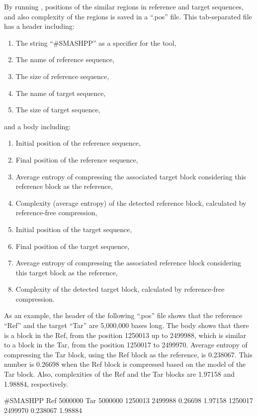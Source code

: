 By running \smashpp, positions of the similar regions in reference and target sequences, and also complexity of the regions is saved in a ``.pos'' file. This tab-separated file has a header including:
\begin{enumerate}
  \item The string ``\#SMASHPP'' as a specifier for the \smashpp tool,
  \item The name of reference sequence,
  \item The size of reference sequence,
  \item The name of target sequence,
  \item The size of target sequence,
\end{enumerate}
and a body including:
\begin{enumerate}
  \item Initial position of the reference sequence,
  \item Final position of the reference sequence,
  \item Average entropy of compressing the associated target block considering this reference block as the reference,
  \item Complexity (average entropy) of the detected reference block, calculated by reference-free compression,
  \item Initial position of the target sequence,
  \item Final position of the target sequence,
  \item Average entropy of compressing the associated reference block considering this target block as the reference,
  \item Complexity of the detected target block, calculated by reference-free compression.
\end{enumerate}
As an example, the header of the following ``.pos'' file shows that the reference ``Ref'' and the target ``Tar'' are 5,000,000 bases long. The body shows that there is a block in the Ref, from the position 1250013 up to 2499988, which is similar to a block in the Tar, from the position 1250017 to 2499970. Average entropy of compressing the Tar block, using the Ref block as the reference, is 0.238067. This number is 0.26698 when the Ref block is compressed based on the model of the Tar block. Also, complexities of the Ref and the Tar blocks are 1.97158 and 1.98884, respectively.
\begin{code}[style=bash]
#SMASHPP Ref      5000000  Tar      5000000
1250013	 2499988  0.26698  1.97158  1250017  2499970  0.238067 1.98884
\end{code}


